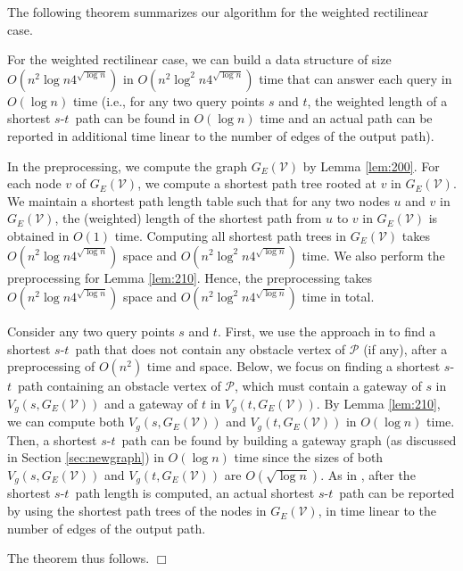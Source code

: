 \documentclass[english,runningheads,11pt]{llncs}
\def\calP{\mathcal{P}}
\def\calV{\mathcal{V}}
\def\st{$s$-$t$}
\newenvironment{proof}{\noindent {\textbf{Proof:}}\rm}{\hfill $\Box$\rm}
\begin{document}
The following theorem summarizes our algorithm for the weighted rectilinear case.

\begin{theorem}\label{theo:30}
For the weighted rectilinear case, we can build a data structure of
size $O(n^2\log n4^{\sqrt{\log n}})$ in $O(n^2\log^{2}n4^{\sqrt{\log
n}})$ time that can answer each query in $O(\log n)$ time (i.e., for
any two query points $s$ and $t$, the weighted length of a shortest \st\ path can be found in $O(\log n)$
time and an actual path can be reported in additional time linear to the number of edges of the output path).
\end{theorem}
\begin{proof}
In the preprocessing, we compute the graph $G_E(\calV)$ by Lemma \ref{lem:200}. For each node
$v$ of $G_E(\calV)$, we compute a shortest path tree rooted at $v$ in $G_E(\calV)$. We maintain
a shortest path length table such that for any two nodes $u$ and $v$ in $G_E(\calV)$, the
(weighted) length of the shortest path from $u$ to $v$ in $G_E(\calV)$ is obtained in $O(1)$ time.
Computing all shortest path trees in $G_E(\calV)$ takes
$O(n^2\log n4^{\sqrt{\log n}})$ space and $O(n^2\log^{2}n4^{\sqrt{\log n}})$ time. We also
perform the preprocessing for Lemma \ref{lem:210}. Hence, the preprocessing takes
$O(n^2\log n4^{\sqrt{\log n}})$ space and $O(n^2\log^{2}n4^{\sqrt{\log n}})$ time in total.

Consider any two query points $s$ and $t$. First, we use the approach in \cite{ref:ChenSh00}
to find a shortest \st\ path that does not contain any obstacle vertex of $\calP$ (if any),
after a preprocessing of $O(n^2)$ time and space. Below, we focus on finding a shortest \st\
path containing an obstacle vertex of $\calP$, which must contain a gateway of $s$ in
$V_g(s,G_E(\calV))$ and a gateway of $t$ in $V_g(t,G_E(\calV))$. By Lemma \ref{lem:210}, we
can compute both $V_g(s,G_E(\calV))$ and $V_g(t,G_E(\calV))$ in $O(\log n)$ time. Then, a
shortest \st\ path can be found by building a gateway graph (as discussed in
Section \ref{sec:newgraph}) in $O(\log n)$ time since the sizes of both $V_g(s,G_E(\calV))$
and $V_g(t,G_E(\calV))$ are $O(\sqrt{\log n})$. As in \cite{ref:ChenSh00}, after the shortest
\st\ path length is computed, an actual shortest \st\ path can be reported by using the shortest
path trees of the nodes in $G_E(\calV)$, in time linear to the number of edges of the output path.

The theorem thus follows.
\end{proof}
\end{document}
